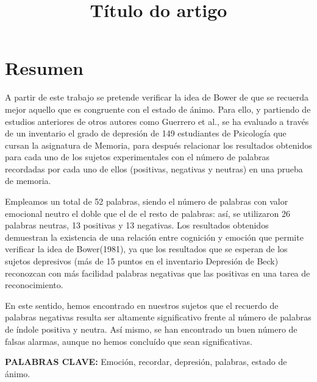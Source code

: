 \documentclass[a4paper,11pt]{article}
\title{Título do artigo}
\author{}
\date{} %
\begin{document}
  


\maketitle 
\thispagestyle{empty}  
  
\newpage
\thispagestyle{empty}     
\tableofcontents  %


\newpage
\setcounter{page}{1}   

\pagestyle{fancy}
\lhead{}
\cfoot{\thepage}

\section{Resumen}
A partir de este trabajo se pretende verificar la idea de Bower de que se recuerda mejor aquello que es congruente con el estado de ánimo. Para ello, y partiendo de estudios anteriores de otros autores como Guerrero et al., se ha evaluado a través de un inventario el grado de depresión de 149 estudiantes de Psicología que cursan la asignatura de Memoria,  para después relacionar los resultados obtenidos para cada uno de los sujetos experimentales con el número de palabras recordadas por cada uno de ellos (positivas, negativas y neutras) en una prueba de memoria. 

Empleamos un total de 52 palabras, siendo el número de palabras con valor emocional neutro el doble que el de el resto de palabras: así, se utilizaron 26 palabras neutras, 13 positivas y 13 negativas. Los resultados obtenidos demuestran la existencia de una relación entre cognición y emoción que permite verificar la idea de Bower(1981), ya que los resultados que se esperan de los sujetos depresivos (más de 15 puntos en el inventario Depresión de Beck) reconozcan con más facilidad palabras negativas que las positivas en una tarea de reconocimiento.  

En este sentido, hemos encontrado en nuestros sujetos que el recuerdo de palabras negativas resulta ser altamente significativo frente al número de palabras de índole positiva y neutra. Así mismo, se han encontrado un buen número de falsas alarmas, aunque no hemos concluído que sean significativas. 

\vspace{1cm}

\textbf{PALABRAS CLAVE:} Emoción, recordar, depresión, palabras, estado de ánimo. 
\end{document}
